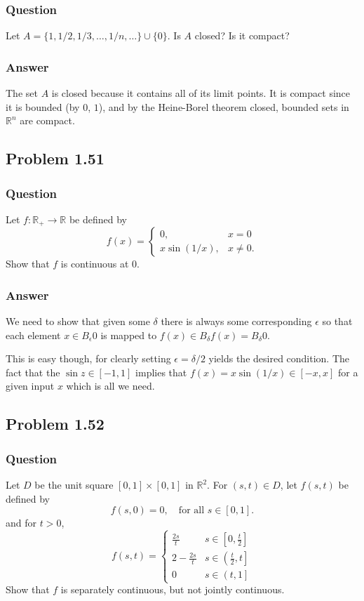 \documentclass[12pt]{article}
\begin{document}
\subsubsection{Question}
Let $A = \{1,1/2,1/3,\dots,1/n,\dots\} \cup \{0\}$. Is $A$ closed? Is it compact?
\subsubsection{Answer}
The set $A$ is closed because it contains all of its limit points. It is compact since it is bounded (by $0$, $1$), and by the Heine-Borel theorem closed, bounded sets in $\mathbb{R}^n$ are compact.
\subsection{Problem 1.51}
\subsubsection{Question}
Let $f:\mathbb{R}_+ \to \mathbb{R}$ be defined by
\[f(x)= \left\{ \begin{array} {cr} 0, & x=0 \\ x \sin{(1/x)}, & x \neq 0.\end{array} \right.\]
Show that $f$ is continuous at $0$.
\subsubsection{Answer}
We need to show that given some $\delta$ there is always some corresponding $\epsilon$ so that each element $x \in B_\epsilon 0$ is mapped to $f(x) \in B_\delta f(x)= B_\delta 0 $. 

This is easy though, for clearly setting $\epsilon = \delta/ 2$ yields the desired condition. The fact that the $\sin{z} \in [-1,1]$ implies that $f(x)=x \sin{(1/x)} \in [-x,x]$ for a given input $x$ which is all we need.
\subsection{Problem 1.52}
\subsubsection{Question}
Let $D$ be the unit square $[0,1] \times [0,1]$ in $\mathbb{R}^2$. For $(s,t) \in D$, let $f(s,t)$ be defined by 
\[f(s,0)=0, \quad  \textrm{for all } s\in[0,1].\]
and for $t>0$,
\[f(s,t)= \left\{ \begin{array} {cr} \frac{2s}{t} & s \in \left[ 0, \frac{t}{2} \right] \\ 2-\frac{2 s}{t} & s \in \left( \frac{t}{2} , t \right] \\ 0 & s \in \left( t, 1 \right] \end{array} \right.\]
Show that $f$ is separately continuous, but not jointly continuous.
\end{document}
